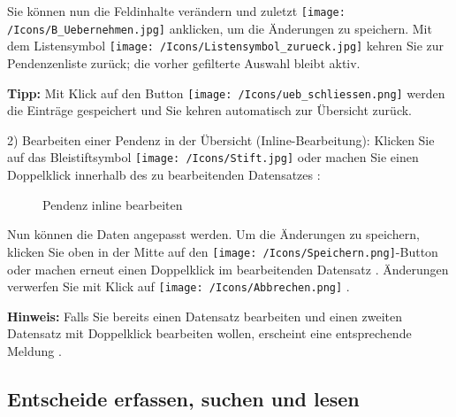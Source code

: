 Sie können nun die Feldinhalte verändern und zuletzt \texttt{[image: /Icons/B\_Uebernehmen.jpg]} anklicken, um die Änderungen zu speichern. Mit dem Listensymbol \texttt{[image: /Icons/Listensymbol\_zurueck.jpg]}  kehren Sie zur Pendenzenliste zurück; die vorher gefilterte Auswahl bleibt aktiv.

\vspace{\baselineskip}

\textbf{Tipp:} Mit Klick auf den Button \texttt{[image: /Icons/ueb\_schliessen.png]} werden die Einträge gespeichert und Sie kehren automatisch zur Übersicht zurück.

\vspace{\baselineskip}

2) Bearbeiten einer Pendenz in der Übersicht (Inline-Bearbeitung): Klicken Sie auf das Bleistiftsymbol \texttt{[image: /Icons/Stift.jpg]}  oder machen Sie einen Doppelklick innerhalb des zu bearbeitenden Datensatzes :

\begin{figure}[H]
\caption{Pendenz inline bearbeiten}
\end{figure}

Nun können die Daten angepasst werden. Um die Änderungen zu speichern, klicken Sie oben in der Mitte auf den \texttt{[image: /Icons/Speichern.png]}-Button  oder machen erneut einen Doppelklick im bearbeitenden Datensatz . Änderungen verwerfen Sie mit Klick auf \texttt{[image: /Icons/Abbrechen.png]} .

\vspace{\baselineskip}

\textbf{Hinweis:} Falls Sie bereits einen Datensatz bearbeiten und einen zweiten Datensatz mit Doppelklick bearbeiten wollen, erscheint eine entsprechende Meldung . 

\subsection{Entscheide erfassen, suchen und lesen}

